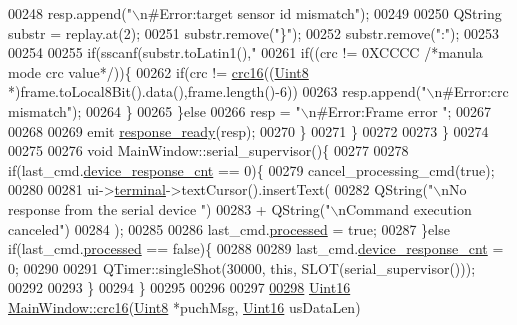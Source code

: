 \begin{DoxyCode}
{{00248               resp.append(\textcolor{stringliteral}{"\(\backslash\)n#Error:target sensor id mismatch"});
00249 
00250           QString substr = replay.at(2);
00251            substr.remove(\textcolor{stringliteral}{"\}"});
00252            substr.remove(\textcolor{stringliteral}{":"});
00253 
00254 
00255           \textcolor{keywordflow}{if}(sscanf(substr.toLatin1(),\textcolor{stringliteral}{"%
00261               \textcolor{keywordflow}{if}((crc != 0XCCCC \textcolor{comment}{/*manula mode crc value*/}))\{
00262               \textcolor{keywordflow}{if}(crc != \hyperlink{a00017_a09ae3cafdd3692fb9fb93bb90a0348d2}{crc16}((\hyperlink{a00004_a979e3e23b9a449e69ab6a8a83b6042f8}{Uint8} *)frame.toLocal8Bit().data(),frame.length()-6))
00263                 resp.append(\textcolor{stringliteral}{"\(\backslash\)n#Error:crc mismatch"});
00264               \}
00265           \}\textcolor{keywordflow}{else}
00266               resp = \textcolor{stringliteral}{"\(\backslash\)n#Error:Frame error "};
00267 
00268 
00269               emit \hyperlink{a00017_a3f6396874778799cf07a7a0149e54977}{response\_ready}(resp);
00270         \}
00271     \}
00272 
00273 \}
00274 
00275 
00276 \textcolor{keywordtype}{void} MainWindow::serial\_supervisor()\{
00277 
00278     \textcolor{keywordflow}{if}(last\_cmd.\hyperlink{a00004_a2b37e66e2555cf1dc26439ad7c30ea78}{device\_response\_cnt} == 0)\{
00279         cancel\_processing\_cmd(\textcolor{keyword}{true});
00280 
00281         ui->\hyperlink{a00080_aae71c46ea4546df5994735dee573b2dd}{terminal}->textCursor().insertText(
00282        QString(\textcolor{stringliteral}{"\(\backslash\)nNo response from the serial device "})
00283        + QString(\textcolor{stringliteral}{"\(\backslash\)nCommand execution canceled"})
00284                     );
00285 
00286         last\_cmd.\hyperlink{a00004_a3e88f779da9798a5da7dda227e2ca388}{processed} = \textcolor{keyword}{true};
00287    \}\textcolor{keywordflow}{else} \textcolor{keywordflow}{if}(last\_cmd.\hyperlink{a00004_a3e88f779da9798a5da7dda227e2ca388}{processed} == \textcolor{keyword}{false})\{
00288 
00289         last\_cmd.\hyperlink{a00004_a2b37e66e2555cf1dc26439ad7c30ea78}{device\_response\_cnt} = 0;
00290 
00291         QTimer::singleShot(30000, \textcolor{keyword}{this}, SLOT(serial\_supervisor()));
00292 
00293     \}
00294 \}
00295 
00296 
00297 
\hypertarget{a00137_source_l00298}{}\hyperlink{a00017_a09ae3cafdd3692fb9fb93bb90a0348d2}{00298} \hyperlink{a00004_aae7407b021d43f7193a81a58cfb3e297}{Uint16} \hyperlink{a00017_a09ae3cafdd3692fb9fb93bb90a0348d2}{MainWindow::crc16}(\hyperlink{a00004_a979e3e23b9a449e69ab6a8a83b6042f8}{Uint8} *puchMsg, \hyperlink{a00004_aae7407b021d43f7193a81a58cfb3e297}{Uint16} usDataLen)
}}}
\end{DoxyCode}
